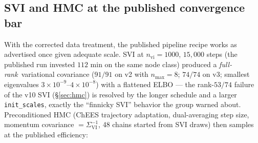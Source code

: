 \documentclass[11pt,letterpaper]{article}
\begin{document}
\subsection{SVI and HMC at the published convergence bar}
\label{sec:campaign-hmc}

With the corrected data treatment, the published pipeline recipe works
as advertised once given adequate scale. SVI at $n_{\mathrm{vi}}=1000$,
$15{,}000$ steps (the published run invested $112$ min on the same
node class) produced a {\it full-rank}\ variational covariance
($91/91$ on v2 with $n_{\max}=8$; $74/74$ on v3; smallest eigenvalues
$3\times10^{-9}$--$4\times10^{-8}$) with a flattened ELBO --- the
rank-$53/74$ failure of the v10 SVI (\S\ref{sec:hmc}) is resolved by
the longer schedule and a larger \texttt{init\_scales}, exactly the
``finnicky SVI'' behavior the group warned about. Preconditioned HMC
(ChEES trajectory adaptation, dual-averaging step size, momentum
covariance $=\Sigma_{\mathrm{VI}}^{-1}$, 48 chains started from SVI
draws) then samples at the published efficiency:
\end{document}
